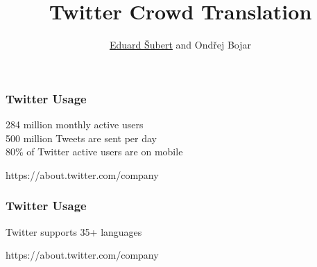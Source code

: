 \documentclass[12pt]{beamer}
\title{\textbf{Twitter Crowd Translation}}
\author{
\underline{Eduard \v{S}ubert} %
and
{Ond\v{r}ej Bojar}\\
}
\begin{document}
\frame{\titlepage}


\begin{frame}
	\frametitle{Twitter Usage}
	\vfill
	\begin{center}
	\textcolor{TCTsilver}{\Large 284 million monthly active users}
	\\[0.7cm]
	\textcolor{TCTsilver}{\Large 500 million Tweets are sent per day}
	\\[0.7cm]
	\textcolor{TCTsilver}{\Large 80\% of Twitter active users are on mobile}
	\end{center}
	\vfill
	\hfill\textcolor{TCTsilver}{https://about.twitter.com/company}
\end{frame}

\begin{frame}
	\frametitle{Twitter Usage}
	\vfill
	\begin{center}
	\textcolor{TCTgray}{\Large Twitter supports 35+ languages}
	\end{center}
	\vfill
	\hfill\textcolor{TCTgray}{https://about.twitter.com/company}
\end{frame}

\end{document}

